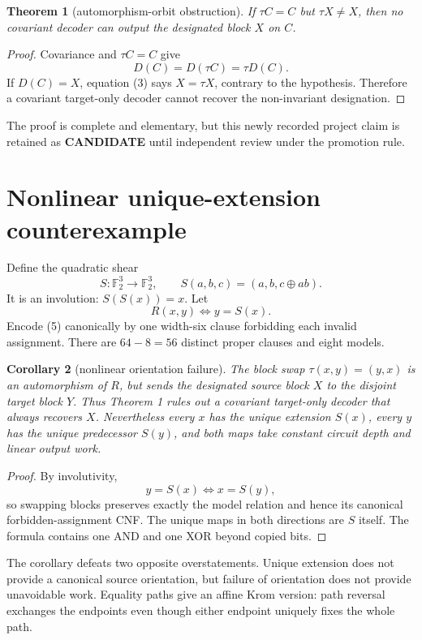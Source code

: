\documentclass[11pt]{article}
\newtheorem{theorem}{Theorem}
\newtheorem{corollary}[theorem]{Corollary}
\newcommand{\F}{\mathbb F_2}
\newcommand{\CAND}{\textbf{CANDIDATE}}
\begin{document}
\begin{theorem}[automorphism-orbit obstruction]
If $\tau C=C$ but $\tau X\ne X$, then no covariant decoder can output the
designated block $X$ on $C$.
\end{theorem}
\begin{proof}
Covariance and $\tau C=C$ give
\[
 D(C)=D(\tau C)=\tau D(C).                               \tag{3}
\]
If $D(C)=X$, equation (3) says $X=\tau X$, contrary to the hypothesis.
Therefore a covariant target-only decoder cannot recover the non-invariant
designation.
\end{proof}

The proof is complete and elementary, but this newly recorded project claim
is retained as \CAND{} until independent review under the promotion rule.

\section{Nonlinear unique-extension counterexample}
Define the quadratic shear
\[
 S:\F^3\to\F^3,\qquad S(a,b,c)=(a,b,c\oplus ab).          \tag{4}
\]
It is an involution: $S(S(x))=x$.  Let
\[
 R(x,y)\iff y=S(x).                                      \tag{5}
\]
Encode (5) canonically by one width-six clause forbidding each invalid
assignment.  There are $64-8=56$ distinct proper clauses and eight models.

\begin{corollary}[nonlinear orientation failure]
The block swap $\tau(x,y)=(y,x)$ is an automorphism of $R$, but sends the
designated source block $X$ to the disjoint target block $Y$.  Thus Theorem 1
rules out a covariant target-only decoder that always recovers $X$.
Nevertheless every $x$ has the unique extension $S(x)$, every $y$ has the
unique predecessor $S(y)$, and both maps take constant circuit depth and
linear output work.
\end{corollary}
\begin{proof}
By involutivity,
\[
 y=S(x)\iff x=S(y),                                      \tag{6}
\]
so swapping blocks preserves exactly the model relation and hence its
canonical forbidden-assignment CNF.  The unique maps in both directions are
$S$ itself.  The formula contains one AND and one XOR beyond copied bits.
\end{proof}

The corollary defeats two opposite overstatements.  Unique extension does not
provide a canonical source orientation, but failure of orientation does not
provide unavoidable work.  Equality paths give an affine Krom version: path
reversal exchanges the endpoints even though either endpoint uniquely fixes
the whole path.
\end{document}
